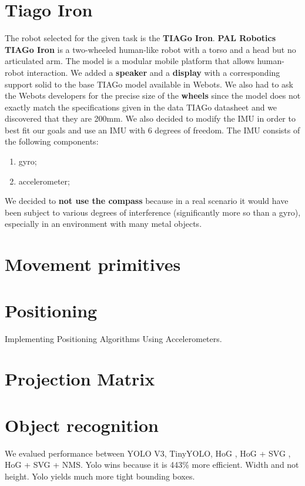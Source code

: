 \documentclass[a4paper]{article}
\begin{document}
	\section{Tiago Iron} 
	The robot selected for the given task is the \textbf{TIAGo Iron}. \newline\textbf{PAL Robotics TIAGo Iron}\cite{tiagoiron} is a two-wheeled human-like robot with a torso and a head but no articulated arm. The model is a modular mobile platform that allows human-robot interaction.\newline
	We added a \textbf{speaker} and a \textbf{display} with a corresponding support solid to the base TIAGo model available in Webots.
	We also had to ask the Webots developers for the precise size of the \textbf{wheels} since the model does not exactly match the specifications given in the data TIAGo datasheet\cite{Tiago IRON datasheet} and we discovered that they are 200mm.
	\newline We also decided to modify the IMU in order to best fit our goals and use an IMU with 6 degrees of freedom.
	The IMU consists of the following components:
		\begin{enumerate}
			\item gyro;	
			\item accelerometer;
		\end{enumerate}
	We decided to \textbf{not use the compass} because in a real scenario it would have been subject to various degrees of interference (significantly more so than a gyro), especially in an environment with many metal objects.
	
	\section{Movement primitives}
	\cite{positioning}
	
	\section{Positioning}
	Implementing Positioning Algorithms Using Accelerometers.
	
	\section{Projection Matrix}
	\cite{OpenGL}
	
	\section{Object recognition}
	We evalued performance between YOLO V3, TinyYOLO, HoG , HoG + SVG  , HoG + SVG + NMS. Yolo wins because it is 443\% more efficient. Width and not height. Yolo yields much more tight bounding boxes. 
	
\end{document}
